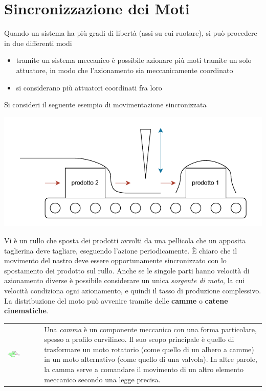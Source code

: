 \documentclass[10pt, letterpaper]{report}
\begin{document}
\section{Sincronizzazione dei Moti}
Quando un sistema ha più gradi di libertà (assi su cui ruotare), si può procedere in due differenti modi\begin{itemize}
    \item tramite un sistema meccanico è possibile azionare più moti tramite un solo attuatore, in modo che l'azionamento sia meccanicamente coordinato 
    \item si considerano più attuatori coordinati fra loro
\end{itemize}
Si consideri il seguente esempio di movimentazione sincronizzata
\begin{center}
    \includegraphics[width=1\textwidth]{images/azionamentoSincronizzato.pdf}
\end{center}
Vi è un rullo che sposta dei prodotti avvolti da una pellicola che un apposita taglierina deve tagliare, eseguendo l'azione periodicamente. È chiaro che il movimento del nastro deve essere opportunamente sincronizzato con lo spostamento dei prodotto sul rullo. Anche se le singole parti hanno velocità di azionamento diverse è possibile considerare un unica \textit{sorgente di moto}, la cui velocità condiziona ogni azionamento, e quindi il tasso di produzione complessivo. \acc 
La distribuzione del moto può avvenire tramite delle \textbf{camme} o \textbf{catene cinematiche}.
\begin{center}
	\begin{tabular}{>{\centering\arraybackslash}m{3in}>{\arraybackslash}m{3in}}
        \includegraphics[width=0.4\textwidth]{images/camma.eps} & {} Una \textit{camma} è un componente meccanico con una forma particolare, spesso a profilo curvilineo. Il suo scopo principale è quello di trasformare un moto rotatorio (come quello di un albero a camme) in un moto alternativo (come quello di una valvola). In altre parole, la camma serve a comandare il movimento di un altro elemento meccanico secondo una legge precisa.
		\\
	\end{tabular}
\end{center}
\end{document}
